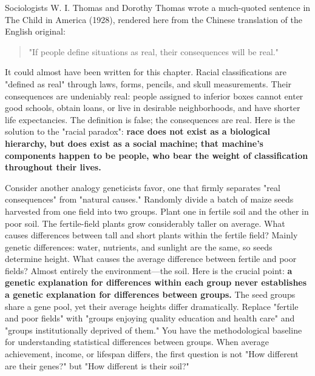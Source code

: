 Sociologists W. I. Thomas and Dorothy Thomas wrote a much-quoted sentence in The Child in America (1928), rendered here from the Chinese translation of the English original:

\begin{quote}
"If people define situations as real, their consequences will be real."
\end{quote}
It could almost have been written for this chapter. Racial classifications are "defined as real" through laws, forms, pencils, and skull measurements. Their consequences are undeniably real: people assigned to inferior boxes cannot enter good schools, obtain loans, or live in desirable neighborhoods, and have shorter life expectancies. The definition is false; the consequences are real. Here is the solution to the "racial paradox": \textbf{race does not exist as a biological hierarchy, but does exist as a social machine; that machine's components happen to be people, who bear the weight of classification throughout their lives.}

Consider another analogy geneticists favor, one that firmly separates "real consequences" from "natural causes." Randomly divide a batch of maize seeds harvested from one field into two groups. Plant one in fertile soil and the other in poor soil. The fertile-field plants grow considerably taller on average. What causes differences between tall and short plants within the fertile field? Mainly genetic differences: water, nutrients, and sunlight are the same, so seeds determine height. What causes the average difference between fertile and poor fields? Almost entirely the environment---the soil. Here is the crucial point: \textbf{a genetic explanation for differences within each group never establishes a genetic explanation for differences between groups.} The seed groups share a gene pool, yet their average heights differ dramatically. Replace "fertile and poor fields" with "groups enjoying quality education and health care" and "groups institutionally deprived of them." You have the methodological baseline for understanding statistical differences between groups. When average achievement, income, or lifespan differs, the first question is not "How different are their genes?" but "How different is their soil?"


